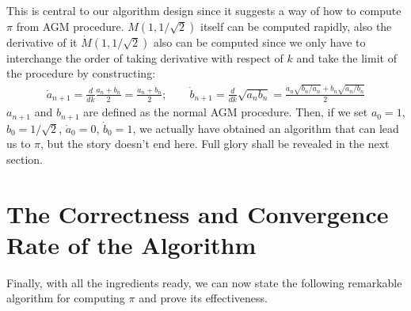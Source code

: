 \documentclass{report}
\begin{document}
\begin{titlepage}
This is central to our algorithm design since it suggests a way of how to compute $\pi$ from AGM procedure. $M(1,1/\sqrt2)$ itself can be computed rapidly\cite{Borwein:1987aa}, also the derivative of it $\dot M(1,1/\sqrt2)$ also can be computed since we only have to interchange the order of taking derivative with respect of $k$ and take the limit of the procedure by constructing:
\begin{align}
\dot a_{n+1}=\frac{d}{dk}\frac{a_n+b_n}{2}=\frac{\dot a_{n}+\dot b_{n}}{2};\qquad \dot b_{n+1}=\frac{d}{dk}\sqrt{a_nb_n}=\frac{\dot a_{n}\sqrt{b_n/a_n}+\dot b_{n}\sqrt{a_n/b_n}}{2}\label{eq:recur}
\end{align}
$a_{n+1}$ and $b_{n+1}$ are defined as the normal AGM procedure. Then, if we set $a_0=1$, $b_0=1/\sqrt2$, $\dot a_0=0$, $\dot b_0=1$,  we actually have obtained  an algorithm that can lead us to $\pi$, but the story doesn't end here. Full glory shall be revealed in the next section.

\section{The Correctness and Convergence Rate of the Algorithm\hfill}
Finally, with all the ingredients ready, we can now state the following remarkable algorithm for computing $\pi$ and prove its effectiveness.


\end{titlepage}
\end{document}
